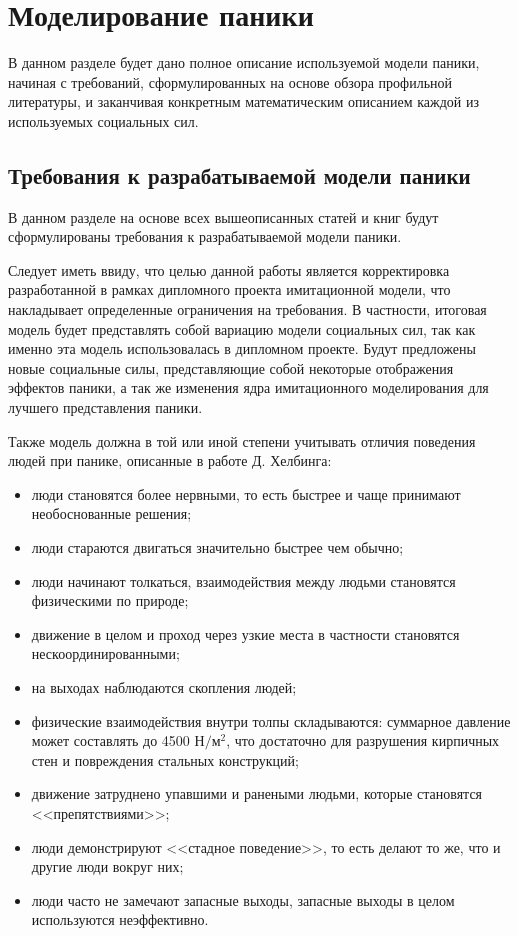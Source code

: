 \section{Моделирование паники}
\label{sec:model}

В данном разделе будет дано полное описание используемой модели паники,
начиная с требований, сформулированных на основе обзора профильной литературы,
и заканчивая конкретным математическим описанием каждой из используемых социальных сил.

\subsection{Требования к разрабатываемой модели паники}
\label{sub:model:demands}

В данном разделе на основе всех вышеописанных статей и книг будут сформулированы требования к разрабатываемой модели паники.

Следует иметь ввиду, что целью данной работы является корректировка разработанной в рамках дипломного проекта имитационной модели, что накладывает определенные ограничения на требования.
В частности, итоговая модель будет представлять собой вариацию модели социальных сил, так как именно эта модель использовалась в дипломном проекте.
Будут предложены новые социальные силы, представляющие собой некоторые отображения эффектов паники, а так же изменения ядра имитационного моделирования для лучшего представления паники.

Также модель должна в той или иной степени учитывать отличия поведения людей при панике, описанные в работе Д. Хелбинга:

\begin{itemize}
  \item люди становятся более нервными, то есть быстрее и чаще принимают необоснованные решения;
  \item люди стараются двигаться значительно быстрее чем обычно;
  \item люди начинают толкаться, взаимодействия между людьми становятся физическими по природе;
  \item движение в целом и проход через узкие места в частности становятся нескоординированными;
  \item на выходах наблюдаются скопления людей;
  \item физические взаимодействия внутри толпы складываются: суммарное давление может составлять до 4500 $\text{Н} / \text{м}^2$,
        что достаточно для разрушения кирпичных стен и повреждения стальных конструкций;
  \item движение затруднено упавшими и ранеными людьми, которые становятся <<препятствиями>>;
  \item люди демонстрируют <<стадное поведение>>, то есть делают то же, что и другие люди вокруг них;
  \item люди часто не замечают запасные выходы, запасные выходы в целом используются неэффективно.
\end{itemize}

